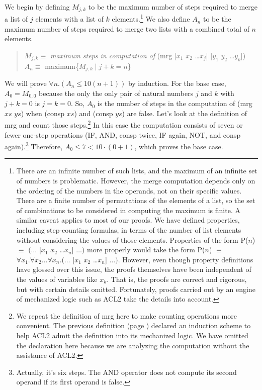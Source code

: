 We begin by defining $M_{j,k}$ to be the maximum number of steps required to merge a list
of $j$ elements with a list of $k$ elements.\footnote{There are an infinite number
of such lists, and the maximum of an infinite set of numbers is problematic.
However, the merge computation depends only
on the ordering of the numbers in the operands,
not on their specific values.
There are a finite number of permutations of the elements of a list,
so the set of combinations to be considered in computing the maximum is finite.
A similar caveat applies to most of our proofs.
We have defined properties, including step-counting formulas,
in terms of the number of list elements
without considering the values of those elements.
Properties of the form P($n$) $\equiv$ $(\dots$ [$x_1$ $x_2$ \dots $x_n$] $\dots)$
more properly would take the form
P($n$) $\equiv$ $\forall x_1.\forall x_2\dots\forall x_n.(\dots$ [$x_1$ $x_2$ \dots $x_n$] $\dots)$.
However, even though property definitions have glossed over this issue,
the proofs themselves have been independent of the values of variables like $x_k$.
That is, the proofs are correct and rigorous, but with certain details omitted.
Fortunately, proofs carried out by an engine of
mechanized logic such as ACL2 take the details into account.}
We also define $A_n$ to be the maximum number of steps required to merge two lists
with a combined total of $n$ elements.
\begin{quote}
$M_{j,k} \equiv$ \emph{maximum steps in computation of} (mrg [$x_1$ $x_2$ \dots $x_j$] [$y_1$ $y_2$ \dots $y_k$]) \\
$A_n \equiv$ maximum\{$M_{j,k} \mid j + k = n$\}
\end{quote}

We will
prove $\forall n.(A_n \leq 10(n+1))$ by induction.
For the base case, $A_0 = M_{0,0}$ because the only the only pair of natural
numbers $j$ and $k$ with $j + k = 0$ is $j = k = 0$.
So, $A_0$ is the number of steps in the computation of (mrg $xs$ $ys$)
when (consp $xs$) and (consp $ys$) are false.
Let's look at the definition of mrg and count those steps.\footnote{We
repeat the definition of mrg here to make counting operations more convenient.
The previous definition (page \pageref{defun:mrg})
declared an induction scheme to help ACL2
admit the definition into its mechanized logic.
We have omitted the declaration here because we are analyzing
the computation without the assistance of ACL2.}
In this case the computation consists of seven or fewer one-step operations
(IF, AND, consp twice, IF again, NOT, and consp again).\footnote{Actually,
it's six steps. The AND operator does not compute its second operand
if its first operand is false.}
Therefore, $A_0 \leq 7 < 10\cdot(0 + 1)$, which proves the base case.

